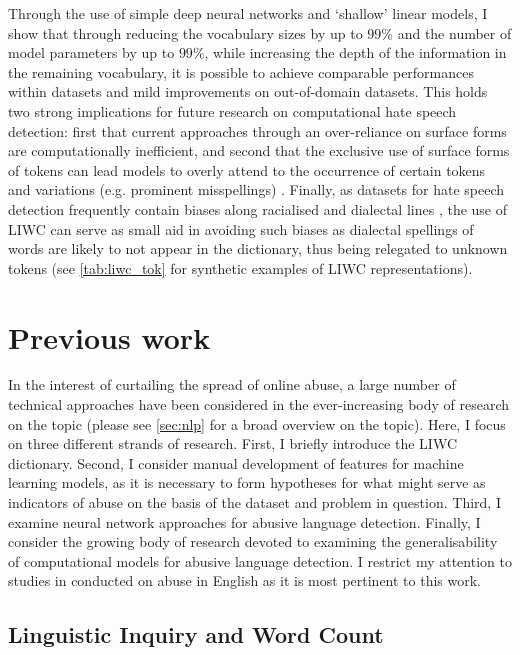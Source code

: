 Through the use of simple deep neural networks and `shallow' linear models, I show that through reducing the vocabulary sizes by up to $99\%$ and the number of model parameters by up to $99\%$, while increasing the depth of the information in the remaining vocabulary, it is possible to achieve comparable performances within datasets and mild improvements on out-of-domain datasets. This holds two strong implications for future research on computational hate speech detection: first that current approaches through an over-reliance on surface forms are computationally inefficient, and second that the exclusive use of surface forms of tokens can lead models to overly attend to the occurrence of certain tokens and variations (e.g. prominent misspellings) \citep{Rottger:2021}. Finally, as datasets for hate speech detection frequently contain biases along racialised and dialectal lines \citep{Waseem:2018,Davidson:2019}, the use of LIWC can serve as small aid in avoiding such biases as dialectal spellings of words are likely to not appear in the dictionary, thus being relegated to unknown tokens (see \cref{tab:liwc_tok} for synthetic examples of LIWC representations).

\section{Previous work}

In the interest of curtailing the spread of online abuse, a large number of technical approaches have been considered in the ever-increasing body of research on the topic (please see \cref{sec:nlp} for a broad overview on the topic). Here, I focus on three different strands of research. First, I briefly introduce the LIWC dictionary. Second, I consider manual development of features for machine learning models, as it is necessary to form hypotheses for what might serve as indicators of abuse on the basis of the dataset and problem in question. Third, I examine neural network approaches for abusive language detection. Finally, I consider the growing body of research devoted to examining the generalisability of computational models for abusive language detection. I restrict my attention to studies in conducted on abuse in English as it is most pertinent to this work.

\subsection{Linguistic Inquiry and Word Count}

